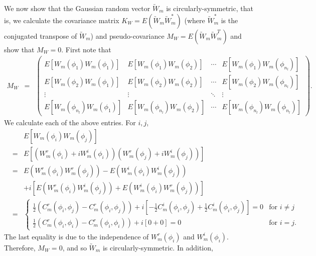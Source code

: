 
We now show that the Gaussian random vector $\utilde{W}_m$ is circularly-symmetric, that is, we calculate the covariance matrix $K_W = E(\utilde{W}_m\utilde{W}_m^*)$ (where $\utilde{W}_m^*$ is the conjugated transpose of $\utilde{W}_m$) and pseudo-covariance $M_W = E(\utilde{W}_m\utilde{W}_m^T)$ and show that $M_W=0$. First note that 
	\begin{eqnarray*}
		M_W & = & \left(\begin{array}{cccc}
		E[W_m(\phi_1) W_m(\phi_1) ] & E[W_m(\phi_1) W_m(\phi_2) ]  & \cdots & E[W_m(\phi_1) W_m(\phi_{n_l}) ]\\
		E[W_m(\phi_2) W_m(\phi_1) ] & E[W_m(\phi_2) W_m(\phi_2) ]  & \cdots & E[W_m(\phi_2) W_m(\phi_{n_l}) ]\\
		\vdots & \vdots  & \ddots & \vdots \\
		E[W_m(\phi_{n_l}) W_m(\phi_1) ] & E[W_m(\phi_{n_l}) W_m(\phi_2) ]  & \cdots & E[W_m(\phi_{n_l}) W_m(\phi_{n_l})]
		\end{array}
		\right).
	\end{eqnarray*}
We calculate each of the above entries.	For $i,j$,
	\begin{eqnarray*}
		& & E[W_m(\phi_i) W_m(\phi_j) ]\\
		&=& E[(W_m^r(\phi_i) + i W_m^i(\phi_i))(W_m^r(\phi_j) + i W_m^i(\phi_j))] \\
		&=& E(W_m^r(\phi_i)W_m^r(\phi_j)) - E(W_m^i(\phi_i)W_m^i(\phi_j)) \\
		& & + i[E(W_m^r(\phi_i)W_m^i(\phi_j)) + E(W_m^i(\phi_i)W_m^r(\phi_j))] \\
		&=& \left\{\begin{array}{ll}
        \frac{1}{2}(C_m^r(\phi_i, \phi_j) - C_m^r(\phi_i, \phi_j)) + i [-\frac{1}{2} C_m^i(\phi_i, \phi_j) + \frac{1}{2}C_m^i(\phi_i, \phi_j)] = 0 & \mbox{for $i \ne j$} \\
		\frac{1}{2}(C_m^r(\phi_i, \phi_i) - C_m^r(\phi_i, \phi_i)) + i [0 + 0] = 0 &  \mbox{for $i = j$}.
\end{array}
\right.
	\end{eqnarray*}
The last equality is due to the independence of $W_m^r(\phi_i)$ and $W_m^i(\phi_i)$. Therefore, $M_W = 0$, and so $\utilde{W}_m$ is circularly-symmetric. In addition,
